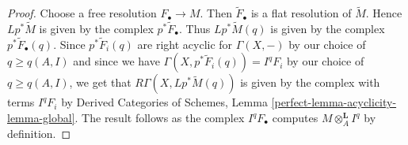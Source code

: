 \documentclass[10pt,a4paper]{amsart}
\theoremstyle{plain}
\theoremstyle{definition}
\theoremstyle{remark}
\numberwithin{equation}{subsection}
\begin{document}
\begin{proof}
Choose a free resolution $F_\bullet \to M$. Then $\widetilde{F}_\bullet$
is a flat resolution of $\widetilde{M}$. Hence $Lp^*\widetilde{M}$
is given by the complex $p^*\widetilde{F}_\bullet$. Thus
$Lp^*\widetilde{M}(q)$ is given by the complex $p^*\widetilde{F}_\bullet(q)$.
Since $p^*\widetilde{F}_i(q)$ are right acyclic for $\Gamma(X, -)$ by
our choice of $q \geq q(A, I)$ and since we have
$\Gamma(X, p^*\widetilde{F}_i(q)) = I^qF_i$ by our choice of $q \geq q(A, I)$,
we get that $R\Gamma(X, Lp^*\widetilde{M}(q))$ is given by the complex
with terms $I^qF_i$ by Derived Categories of Schemes, Lemma
\ref{perfect-lemma-acyclicity-lemma-global}.
The result follows as the complex $I^qF_\bullet$ computes
$M \otimes_A^\mathbf{L} I^q$ by definition.
\end{proof}
\end{document}
